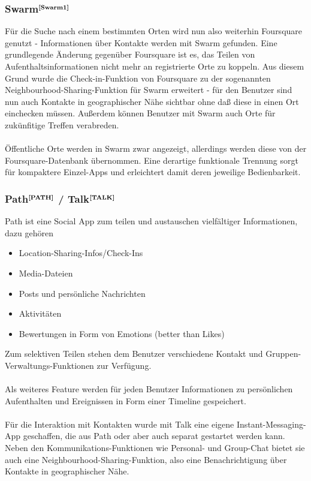 \subsubsection[Swarm]{Swarm$^{\textbf{\ref{Swarm1}}}$}
\addtocounter{footnote}{1}%
Für die Suche nach einem bestimmten Orten wird nun also weiterhin Foursquare genutzt - Informationen über Kontakte werden mit Swarm gefunden. Eine grundlegende Änderung gegenüber Foursquare ist es, das Teilen von Aufenthaltsinformationen nicht mehr an registrierte Orte zu koppeln. Aus diesem Grund wurde die Check-in-Funktion von Foursquare zu der sogenannten Neighbourhood-Sharing-Funktion für Swarm erweitert - für den Benutzer sind nun auch Kontakte in geographischer Nähe sichtbar ohne daß diese in einen Ort einchecken müssen. Außerdem können Benutzer mit Swarm auch  Orte für zukünfitige Treffen verabreden.\\ \\
Öffentliche Orte werden in Swarm zwar angezeigt, allerdings werden diese von der Foursquare-Datenbank übernommen. Eine derartige funktionale Trennung sorgt für kompaktere Einzel-Apps und erleichtert damit deren jeweilige Bedienbarkeit.

\subsubsection[Path]{Path$^{\textbf{\ref{PATH}}}$ / Talk$^{\textbf{\ref{TALK}}}$}
\addtocounter{footnote}{1}
\addtocounter{footnote}{1}
Path ist eine Social App zum teilen und austauschen vielfältiger Informationen, dazu gehören
\begin{itemize}[leftmargin=*,noitemsep,topsep=1ex,parsep=0pt,partopsep=0pt]
\item Location-Sharing-Infos/Check-Ins
\item Media-Dateien
\item Posts und persönliche Nachrichten
\item Aktivitäten
\item Bewertungen in Form von Emotions (better than Likes)
\end{itemize}
Zum selektiven Teilen stehen dem Benutzer verschiedene Kontakt und Gruppen-Verwaltungs-Funktionen zur Verfügung.\\ \\
Als weiteres Feature werden für jeden Benutzer Informationen zu persönlichen Aufenthalten und Ereignissen in Form einer Timeline gespeichert.\\ \\
Für die Interaktion mit Kontakten wurde mit Talk eine eigene Instant-Messaging-App geschaffen, die aus Path oder aber auch separat gestartet werden kann. Neben den Kommunikations-Funktionen wie Personal- und Group-Chat bietet sie auch eine Neighbourhood-Sharing-Funktion, also eine Benachrichtigung über Kontakte in geographischer Nähe. 

